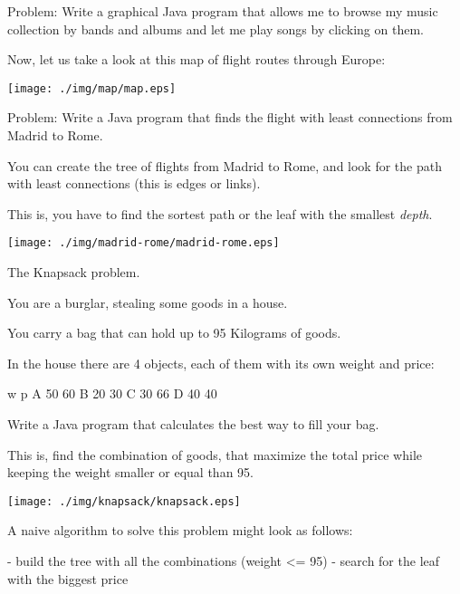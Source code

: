 \documentclass[a4paper, 9pt]{extarticle}
\newcommand{\separator}{\begin{center}%
\noindent\makebox[\linewidth]{\rule{0.75\paperwidth}{0.4pt}}%
\end{center}}
\begin{document}
Problem: Write a graphical Java program that allows me to browse my music collection
by bands and albums and let me play songs by clicking on them.

\separator

Now, let us take a look at this map of flight routes through Europe:

\begin{center}
\texttt{[image: ./img/map/map.eps]}
\end{center}

Problem: Write a Java program that finds the flight with least connections from Madrid to Rome.

You can create the tree of flights from Madrid to Rome, and look for the path
with least connections (this is edges or links).

This is, you have to find the sortest path
or the leaf with the smallest \emph{depth}.

\begin{center}
\texttt{[image: ./img/madrid-rome/madrid-rome.eps]}
\end{center}

\newpage

\separator

The Knapsack problem.

You are a burglar, stealing some goods in a house.

You carry a bag that can hold up to 95 Kilograms of goods.

In the house there are 4 objects, each of them with its own weight and price:

\begin{blackboard}
      w  p
  A  50 60
  B  20 30
  C  30 66
  D  40 40
\end{blackboard}

Write a Java program that calculates the best way to fill your bag.

This is, find the combination of goods, that maximize the total price while keeping the weight smaller or equal than 95.

\begin{center}
\texttt{[image: ./img/knapsack/knapsack.eps]}
\end{center}

A naive algorithm to solve this problem might look as follows:

\begin{blackboard}
  - build the tree with all the combinations (weight <= 95)
  - search for the leaf with the biggest price
\end{blackboard}
\end{document}
